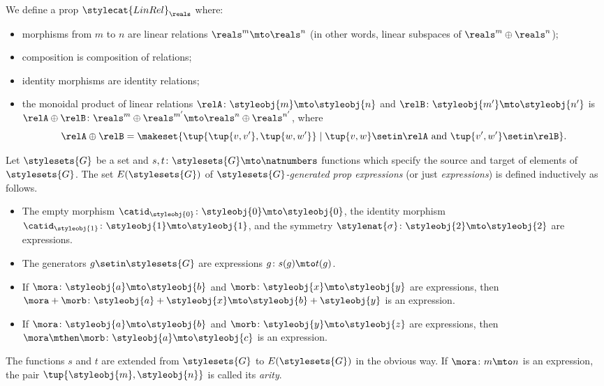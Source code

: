 \begin{example}\label{exa:prop-linrel}
    We define a prop $\stylecat{LinRel}_\reals$ where:
    \begin{itemize}
        \item morphisms from $m$ to $n$ are linear relations $\reals^m \mto \reals^n$ (in other words, linear subspaces of $\reals^m \oplus \reals^n$);
        \item composition is composition of relations;
        \item identity morphisms are identity relations;
        \item the monoidal product of linear relations $\relA \colon \styleobj{m} \mto \styleobj{n}$ and $\relB \colon \styleobj{m'} \mto \styleobj{n'}$ is $\relA \oplus \relB \colon \reals^m \oplus \reals^{m'} \mto \reals^n \oplus \reals^{n'}$, where
              \begin{equation}
                  \relA \oplus \relB = \makeset{\tup{\tup{v,v'},\tup{w,w'}} \mid \tup{v,w} \setin\relA \text{ and } \tup{v', w'} \setin\relB }.
              \end{equation}

    \end{itemize}
\end{example}

\begin{definition}\label{def:prop-expressions}
    Let $\stylesets{G}$ be a set and $s, t \colon \stylesets{G} \mto \natnumbers$ functions which specify the source and target of elements of $\stylesets{G}$.
    The set $E(\stylesets{G})$ of $\stylesets{G}$\emph{-generated prop expressions} (or just \emph{expressions}) is defined inductively as follows.
    \begin{itemize}
        \item The empty morphism $\catid_\styleobj{0} \colon \styleobj{0} \mto \styleobj{0}$, the identity morphism $\catid_\styleobj{1} \colon \styleobj{1} \mto \styleobj{1}$, and the symmetry $\stylenat{\sigma} \colon \styleobj{2} \mto \styleobj{2}$ are expressions.
        \item The generators $g \setin\stylesets{G}$ are expressions $g \colon s(g) \mto t(g)$.
        \item If $\mora \colon \styleobj{a} \mto \styleobj{b}$ and $\morb \colon \styleobj{x} \mto \styleobj{y}$ are expressions, then $\mora + \morb \colon \styleobj{a} + \styleobj{x} \mto \styleobj{b} + \styleobj{y}$ is an expression.
        \item If $\mora \colon \styleobj{a} \mto \styleobj{b}$ and $\morb \colon \styleobj{y} \mto \styleobj{z}$ are expressions, then $\mora \mthen \morb \colon \styleobj{a} \mto \styleobj{c}$ is an expression.
    \end{itemize}
    The functions $s$ and $t$ are extended from $\stylesets{G}$ to $E(\stylesets{G})$ in the obvious way.
    If $\mora \colon m \mto n$ is an expression, the pair $\tup{\styleobj{m}, \styleobj{n}}$ is called its \emph{arity}.
\end{definition}

